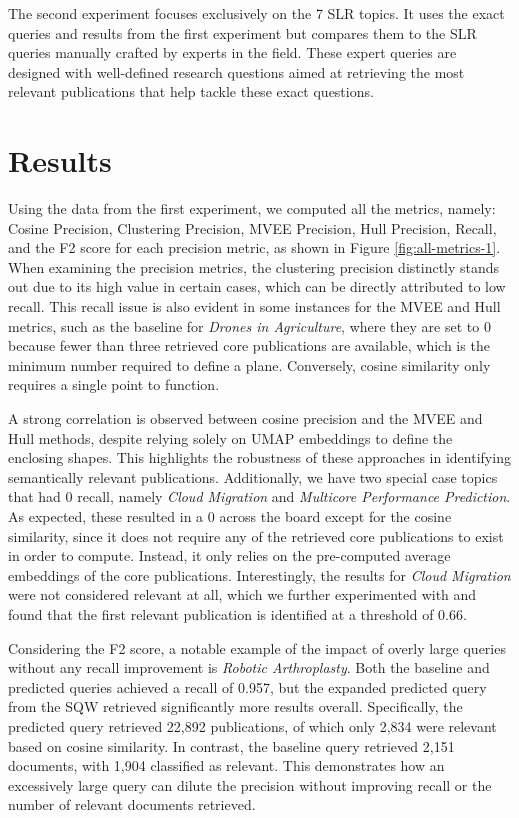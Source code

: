 The second experiment focuses exclusively on the 7 SLR topics. It uses the exact queries and results from the first experiment but compares them to the SLR queries manually crafted by experts in the field. These expert queries are designed with well-defined research questions aimed at retrieving the most relevant publications that help tackle these exact questions.

\section{Results}
Using the data from the first experiment, we computed all the metrics, namely: Cosine Precision, Clustering Precision, MVEE Precision, Hull Precision, Recall, and the F2 score for each precision metric, as shown in Figure \ref{fig:all-metrics-1}. When examining the precision metrics, the clustering precision distinctly stands out due to its high value in certain cases, which can be directly attributed to low recall. This recall issue is also evident in some instances for the MVEE and Hull metrics, such as the baseline for \textit{Drones in Agriculture}, where they are set to 0 because fewer than three retrieved core publications are available, which is the minimum number required to define a plane. Conversely, cosine similarity only requires a single point to function.

A strong correlation is observed between cosine precision and the MVEE and Hull methods, despite relying solely on UMAP embeddings to define the enclosing shapes. This highlights the robustness of these approaches in identifying semantically relevant publications. Additionally, we have two special case topics that had 0 recall, namely \textit{Cloud Migration} and \textit{Multicore Performance Prediction}. As expected, these resulted in a 0 across the board except for the cosine similarity, since it does not require any of the retrieved core publications to exist in order to compute. Instead, it only relies on the pre-computed average embeddings of the core publications. Interestingly, the results for \textit{Cloud Migration} were not considered relevant at all, which we further experimented with and found that the first relevant publication is identified at a threshold of 0.66.


Considering the F2 score, a notable example of the impact of overly large queries without any recall improvement is \textit{Robotic Arthroplasty}. Both the baseline and predicted queries achieved a recall of 0.957, but the expanded predicted query from the SQW retrieved significantly more results overall. Specifically, the predicted query retrieved 22,892 publications, of which only 2,834 were relevant based on cosine similarity. In contrast, the baseline query retrieved 2,151 documents, with 1,904 classified as relevant. This demonstrates how an excessively large query can dilute the precision without improving recall or the number of relevant documents retrieved.

